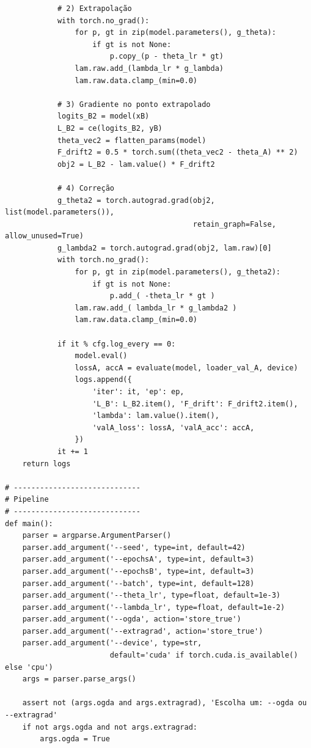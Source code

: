 \documentclass[9pt,a4paper]{extarticle}
\begin{document}
\begin{lstlisting}
            # 2) Extrapolação
            with torch.no_grad():
                for p, gt in zip(model.parameters(), g_theta):
                    if gt is not None:
                        p.copy_(p - theta_lr * gt)
                lam.raw.add_(lambda_lr * g_lambda)
                lam.raw.data.clamp_(min=0.0)

            # 3) Gradiente no ponto extrapolado
            logits_B2 = model(xB)
            L_B2 = ce(logits_B2, yB)
            theta_vec2 = flatten_params(model)
            F_drift2 = 0.5 * torch.sum((theta_vec2 - theta_A) ** 2)
            obj2 = L_B2 - lam.value() * F_drift2

            # 4) Correção
            g_theta2 = torch.autograd.grad(obj2, list(model.parameters()),
                                           retain_graph=False, allow_unused=True)
            g_lambda2 = torch.autograd.grad(obj2, lam.raw)[0]
            with torch.no_grad():
                for p, gt in zip(model.parameters(), g_theta2):
                    if gt is not None:
                        p.add_( -theta_lr * gt )
                lam.raw.add_( lambda_lr * g_lambda2 )
                lam.raw.data.clamp_(min=0.0)

            if it % cfg.log_every == 0:
                model.eval()
                lossA, accA = evaluate(model, loader_val_A, device)
                logs.append({
                    'iter': it, 'ep': ep,
                    'L_B': L_B2.item(), 'F_drift': F_drift2.item(),
                    'lambda': lam.value().item(),
                    'valA_loss': lossA, 'valA_acc': accA,
                })
            it += 1
    return logs

# -----------------------------
# Pipeline
# -----------------------------
def main():
    parser = argparse.ArgumentParser()
    parser.add_argument('--seed', type=int, default=42)
    parser.add_argument('--epochsA', type=int, default=3)
    parser.add_argument('--epochsB', type=int, default=3)
    parser.add_argument('--batch', type=int, default=128)
    parser.add_argument('--theta_lr', type=float, default=1e-3)
    parser.add_argument('--lambda_lr', type=float, default=1e-2)
    parser.add_argument('--ogda', action='store_true')
    parser.add_argument('--extragrad', action='store_true')
    parser.add_argument('--device', type=str,
                        default='cuda' if torch.cuda.is_available() else 'cpu')
    args = parser.parse_args()

    assert not (args.ogda and args.extragrad), 'Escolha um: --ogda ou --extragrad'
    if not args.ogda and not args.extragrad:
        args.ogda = True


\end{lstlisting}
\end{document}
